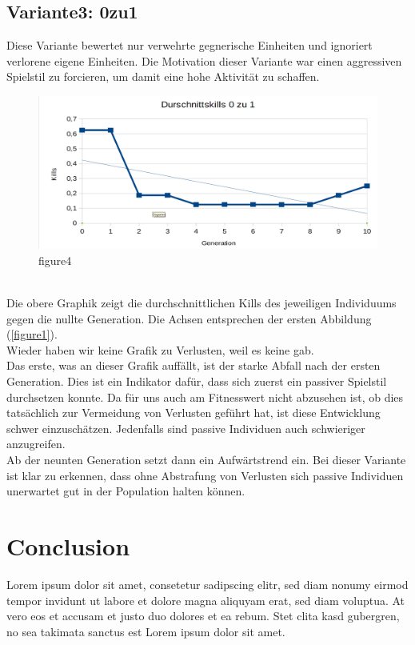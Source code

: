 \documentclass[
	12pt,
	a4paper,
	BCOR10mm,
	DIV14,
	headsepline,
	usegeometry,
]{scrreprt}
\begin{document}
\section{Variante3: 0zu1}
Diese Variante bewertet nur verwehrte gegnerische Einheiten und ignoriert verlorene eigene Einheiten. Die Motivation dieser Variante war einen aggressiven Spielstil zu forcieren, um damit eine hohe Aktivität zu schaffen.
\begin{figure}[h]
	\includegraphics[width = \textwidth]{Durchschnittskills0zu1.png}
	\caption{figure4}
	\label{figure4}
\end{figure}\\
Die obere Graphik zeigt die durchschnittlichen Kills des jeweiligen Individuums gegen die nullte Generation. Die Achsen entsprechen der ersten Abbildung (\ref{figure1}).\\
Wieder haben wir keine Grafik zu Verlusten, weil es keine gab.\\
Das erste, was an dieser Grafik auffällt, ist der starke Abfall nach der ersten Generation. Dies ist ein Indikator dafür, dass sich zuerst ein passiver Spielstil durchsetzen konnte. Da für uns auch am Fitnesswert nicht abzusehen ist, ob dies tatsächlich zur Vermeidung von Verlusten geführt hat, ist diese Entwicklung schwer einzuschätzen. Jedenfalls sind passive Individuen auch schwieriger anzugreifen.\\
Ab der neunten Generation setzt dann ein Aufwärtstrend ein. Bei dieser Variante ist klar zu erkennen, dass ohne Abstrafung von Verlusten sich passive Individuen unerwartet gut in der Population halten können.

\chapter{Conclusion}
\label{Conclusion}

Lorem ipsum dolor sit amet, consetetur sadipscing elitr, sed diam nonumy eirmod tempor invidunt ut labore et dolore magna aliquyam erat, sed diam voluptua.
At vero eos et accusam et justo duo dolores et ea rebum.
Stet clita kasd gubergren, no sea takimata sanctus est Lorem ipsum dolor sit amet.
\end{document}
